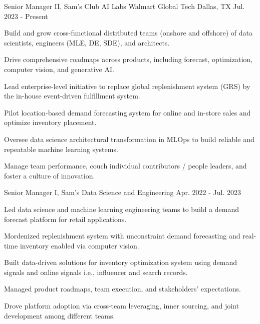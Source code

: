 

\begin{cventries}

	\cventry
		{Senior Manager II, Sam's Club AI Labs} %
		{Walmart Global Tech} %
		{Dallas, TX} %
		{Jul. 2023 - Present} %
		{
			\begin{cvitems} %
				\item {Build and grow cross-functional distributed teams (onshore and offshore) of data scientists, engineers (MLE, DE, SDE), and architects.}
				\item {Drive comprehensive roadmaps across products, including forecast, optimization, computer vision, and generative AI.}
        \item {Lead enterprise-level initiative to replace global replenishment system (GRS) by the in-house event-driven fulfillment system.}
        \item {Pilot location-based demand forecasting system for online and in-store sales and optimize inventory placement.}
				\item {Oversee data science architectural transformation in MLOps to build reliable and repeatable machine learning systems.}
				\item {Manage team performance, couch individual contributors / people leaders, and foster a culture of innovation.}
			\end{cvitems}
		}

	\cventry
		{Senior Manager I, Sam's Data Science and Engineering} %
		{} %
		{} %
		{Apr. 2022 - Jul. 2023} %
		{
				\begin{cvitems} %
						\item {Led data science and machine learning engineering teams to build a demand forecast platform for retail applications.}
            \item {Mordenized replenishment system with unconstraint demand forecasting and real-time inventory enabled via computer vision.} 
            \item {Built data-driven solutions for inventory optimization system using demand signals and online signals i.e., influencer and search records.}
						\item {Managed product roadmaps, team execution, and stakeholders' expectations.}
						\item {Drove platform adoption via cross-team leveraging, inner sourcing, and joint development among different teams.}
				\end{cvitems}
	}



\end{cventries}
